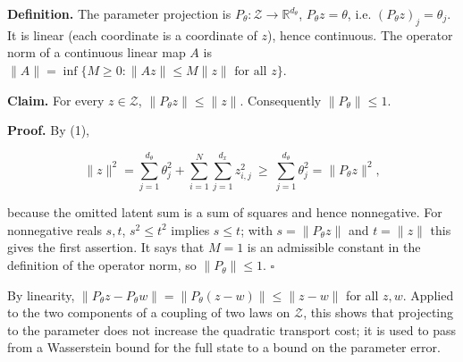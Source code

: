\documentclass[11pt,a4paper]{article}
\begin{document}
\textbf{Definition.} The parameter projection is \(P_\theta:\mathcal Z\to\mathbb R^{d_\theta}\), \(P_\theta z=\theta\), i.e. \((P_\theta z)_j=\theta_j\). It is linear (each coordinate is a coordinate of \(z\)), hence continuous. The operator norm of a continuous linear map \(A\) is \(\|A\|=\inf\{M\ge0:\|Az\|\le M\|z\|\text{ for all }z\}\).




\textbf{Claim.} For every \(z\in\mathcal Z\), \(\|P_\theta z\|\le\|z\|\). Consequently \(\|P_\theta\|\le1\).




\textbf{Proof.} By (1),


\[\|z\|^2=\sum_{j=1}^{d_\theta}\theta_j^2+\sum_{i=1}^N\sum_{j=1}^{d_x}z_{i,j}^2\ \ge\ \sum_{j=1}^{d_\theta}\theta_j^2=\|P_\theta z\|^2,\]


because the omitted latent sum is a sum of squares and hence nonnegative. For nonnegative reals \(s,t\), \(s^2\le t^2\) implies \(s\le t\); with \(s=\|P_\theta z\|\) and \(t=\|z\|\) this gives the first assertion. It says that \(M=1\) is an admissible constant in the definition of the operator norm, so \(\|P_\theta\|\le1\). \(\square\)




By linearity, \(\|P_\theta z-P_\theta w\|=\|P_\theta(z-w)\|\le\|z-w\|\) for all \(z,w\). Applied to the two components of a coupling of two laws on \(\mathcal Z\), this shows that projecting to the parameter does not increase the quadratic transport cost; it is used to pass from a Wasserstein bound for the full state to a bound on the parameter error.
\end{document}
